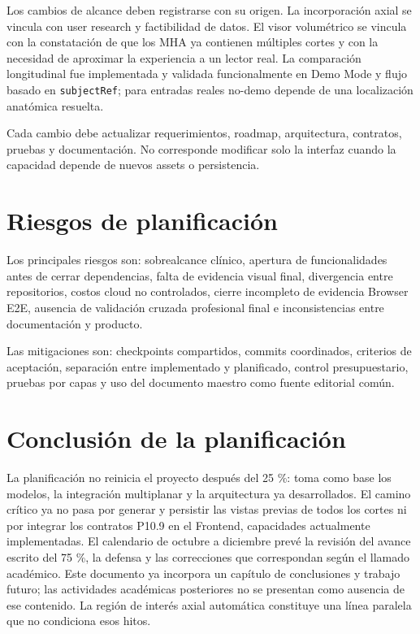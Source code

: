 Los cambios de alcance deben registrarse con su origen. La incorporación axial se vincula con user research y factibilidad de datos. El visor volumétrico se vincula con la constatación de que los MHA ya contienen múltiples cortes y con la necesidad de aproximar la experiencia a un lector real. La comparación longitudinal fue implementada y validada funcionalmente en Demo Mode y flujo basado en \texttt{subjectRef}; para entradas reales no-demo depende de una localización anatómica resuelta.

Cada cambio debe actualizar requerimientos, roadmap, arquitectura, contratos, pruebas y documentación. No corresponde modificar solo la interfaz cuando la capacidad depende de nuevos assets o persistencia.

\section{Riesgos de planificación}

Los principales riesgos son: sobrealcance clínico, apertura de funcionalidades antes de cerrar dependencias, falta de evidencia visual final, divergencia entre repositorios, costos cloud no controlados, cierre incompleto de evidencia Browser E2E, ausencia de validación cruzada profesional final e inconsistencias entre documentación y producto.

Las mitigaciones son: checkpoints compartidos, commits coordinados, criterios de aceptación, separación entre implementado y planificado, control presupuestario, pruebas por capas y uso del documento maestro como fuente editorial común.

\section{Conclusión de la planificación}

La planificación no reinicia el proyecto después del 25 \%: toma como base los modelos, la integración multiplanar y la arquitectura ya desarrollados. El camino crítico ya no pasa por generar y persistir las vistas previas de todos los cortes ni por integrar los contratos P10.9 en el Frontend, capacidades actualmente implementadas. El calendario de octubre a diciembre prevé la revisión del avance escrito del 75 \%, la defensa y las correcciones que correspondan según el llamado académico. Este documento ya incorpora un capítulo de conclusiones y trabajo futuro; las actividades académicas posteriores no se presentan como ausencia de ese contenido. La región de interés axial automática constituye una línea paralela que no condiciona esos hitos.
